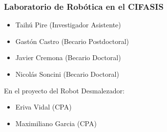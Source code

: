 \begin{frame}
    \frametitle{Laboratorio de Robótica en el CIFASIS}
      
    \begin{itemize}
        \item Taihú Pire (Investigador Asistente)
        \item Gastón Castro (Becario Postdoctoral)
        \item Javier Cremona (Becario Doctoral)
        \item Nicolás Soncini (Becario Doctoral)
    \end{itemize}
    
    En el proyecto del Robot Desmalezador:
    
    \begin{itemize}
        \item Eriva Vidal (CPA)
        \item Maximiliano Garcia (CPA)    
    \end{itemize}
    
\end{frame}


